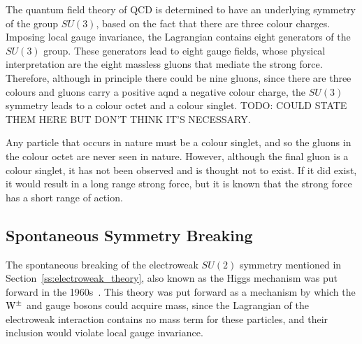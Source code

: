 The quantum field theory of QCD is determined to have an underlying symmetry of the group $SU(3)$, based on
the fact that there are three colour charges. Imposing local gauge invariance, the Lagrangian contains eight
generators of the $SU(3)$ group. These generators lead to eight gauge fields, whose physical interpretation
are the eight massless gluons that mediate the strong force. Therefore, although in principle there could be
nine gluons, since there are three colours and gluons carry a positive aqnd a negative colour charge, the
$SU(3)$ symmetry leads to a colour octet and a colour singlet. TODO: COULD STATE THEM HERE BUT DON'T THINK
IT'S NECESSARY. %


Any particle that occurs in nature must be a colour singlet, and so the gluons in the colour octet are never
seen in nature. However, although the final gluon is a colour singlet, it has not been observed and is
thought not to exist. If it did exist, it would result in a long range strong force, but it is known that the
strong force has a short range of action.

\subsection{Spontaneous Symmetry Breaking}
\label{ss:spontaneous_symmetry_breaking}

The spontaneous breaking of the electroweak $SU(2)$ symmetry mentioned in Section~\ref{ss:electroweak_theory},
also known as the Higgs mechanism was put forward in the 1960s~\cite{Higgs:1964pj}. This theory was put forward as
a mechanism by which the $\mathrm{W}^{\pm}$ and \Z gauge bosons could acquire mass, since the Lagrangian of the
electroweak interaction contains no mass term for these particles, and their inclusion would violate local
gauge invariance.

